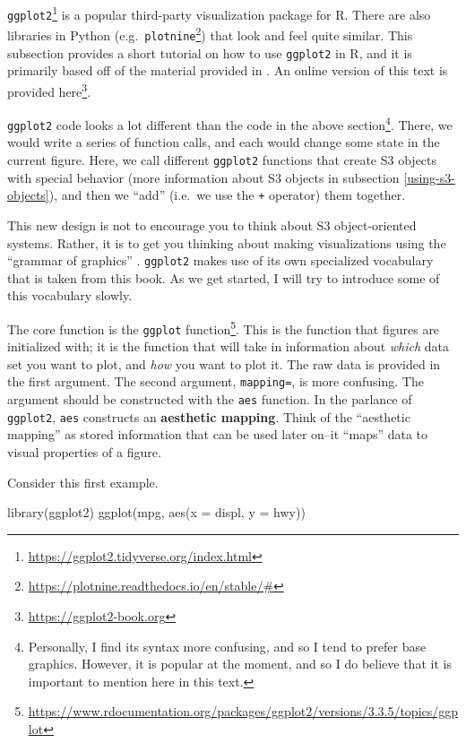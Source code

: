 \documentclass[
  12pt,
  krantz2]{krantz}
\makeatletter
\newenvironment{Shaded}{\begin{snugshade}}{\end{snugshade}}
\newcommand{\AttributeTok}[1]{\textcolor[rgb]{0.61,0.61,0.61}{#1}}
\newcommand{\FunctionTok}[1]{\textcolor[rgb]{0,0,0}{#1}}
\newcommand{\NormalTok}[1]{#1}
\renewcommand{\href}[2]{#2\footnote{\url{#1}}}
\newenvironment{kframe}{%
\medskip{}
\setlength{\fboxsep}{.8em}
 \def\at@end@of@kframe{}%
 \ifinner\ifhmode%
  \def\at@end@of@kframe{\end{minipage}}%
  \begin{minipage}{\columnwidth}%
 \fi\fi%
 \def\FrameCommand##1{\hskip\@totalleftmargin \hskip-\fboxsep
 \colorbox{shadecolor}{##1}\hskip-\fboxsep
     \hskip-\linewidth \hskip-\@totalleftmargin \hskip\columnwidth}%
 \MakeFramed {\advance\hsize-\width
   \@totalleftmargin\z@ \linewidth\hsize
   \@setminipage}}%
 {\par\unskip\endMakeFramed%
 \at@end@of@kframe}
\renewenvironment{Shaded}{\begin{kframe}}{\end{kframe}}
\makeatother
\begin{document}
\href{https://ggplot2.tidyverse.org/index.html}{\texttt{ggplot2}} is a popular third-party visualization package for R. There are also libraries in Python (e.g.~\href{https://plotnine.readthedocs.io/en/stable/\#}{\texttt{plotnine}}) that look and feel quite similar. This subsection provides a short tutorial on how to use \texttt{ggplot2} in R, and it is primarily based off of the material provided in \citep{ggplot2}. An online version of this text is provided \href{https://ggplot2-book.org}{here}.

\texttt{ggplot2} code looks a lot different than the code in the above section\footnote{Personally, I find its syntax more confusing, and so I tend to prefer base graphics. However, it is popular at the moment, and so I do believe that it is important to mention here in this text.}. There, we would write a series of function calls, and each would change some state in the current figure. Here, we call different \texttt{ggplot2} functions that create S3 objects with special behavior (more information about S3 objects in subsection \ref{using-s3-objects}), and then we ``add'' (i.e.~we use the \texttt{+} operator) them together.

This new design is not to encourage you to think about S3 object-oriented systems. Rather, it is to get you thinking about making visualizations using the ``grammar of graphics'' \citep{gog}. \texttt{ggplot2} makes use of its own specialized vocabulary that is taken from this book. As we get started, I will try to introduce some of this vocabulary slowly.

The core function is the \href{https://www.rdocumentation.org/packages/ggplot2/versions/3.3.5/topics/ggplot}{\texttt{ggplot} function}. This is the function that figures are initialized with; it is the function that will take in information about \emph{which} data set you want to plot, and \emph{how} you want to plot it. The raw data is provided in the first argument. The second argument, \texttt{mapping=}, is more confusing. The argument should be constructed with the \texttt{aes} function. In the parlance of \texttt{ggplot2}, \texttt{aes} constructs an \textbf{aesthetic mapping}. Think of the ``aesthetic mapping'' as stored information that can be used later on--it ``maps'' data to visual properties of a figure.

Consider this first example.

\begin{Shaded}
\begin{Highlighting}[]
\FunctionTok{library}\NormalTok{(ggplot2)}
\FunctionTok{ggplot}\NormalTok{(mpg, }\FunctionTok{aes}\NormalTok{(}\AttributeTok{x =}\NormalTok{ displ, }\AttributeTok{y =}\NormalTok{ hwy))}
\end{Highlighting}
\end{Shaded}
\end{document}
